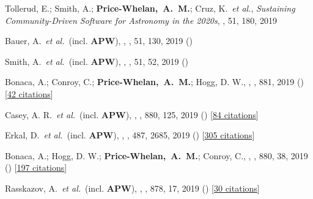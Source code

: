 {\item[{\color{deemph}\scriptsize61}]Tollerud, E.; Smith, A.; \textbf{Price-Whelan,~A.~M.}; Cruz, K.~\textit{et al.}, \textit{Sustaining Community-Driven Software for Astronomy in the 2020s}, \baas, 51, 180, 2019

\item[{\color{deemph}\scriptsize60}]Bauer, A.~\textit{et al.}~(incl. \textbf{APW}), , \baas, 51, 130, 2019 ()

\item[{\color{deemph}\scriptsize59}]Smith, A.~\textit{et al.}~(incl. \textbf{APW}), , \baas, 51, 52, 2019 ()

\item[{\color{deemph}\scriptsize58}]Bonaca, A.; Conroy, C.; \textbf{Price-Whelan,~A.~M.}; Hogg, D. W., , \apj, 881, 2019 () [\href{http://adsabs.harvard.edu/abs/2019ApJ...881L..37B}{42 citations}]

\item[{\color{deemph}\scriptsize57}]Casey, A. R.~\textit{et al.}~(incl. \textbf{APW}), , \apj, 880, 125, 2019 () [\href{http://adsabs.harvard.edu/abs/2019ApJ...880..125C}{84 citations}]

\item[{\color{deemph}\scriptsize56}]Erkal, D.~\textit{et al.}~(incl. \textbf{APW}), , \mnras, 487, 2685, 2019 () [\href{http://adsabs.harvard.edu/abs/2019MNRAS.487.2685E}{305 citations}]

\item[{\color{deemph}\scriptsize55}]Bonaca, A.; Hogg, D. W.; \textbf{Price-Whelan,~A.~M.}; Conroy, C., , \apj, 880, 38, 2019 () [\href{http://adsabs.harvard.edu/abs/2019ApJ...880...38B}{197 citations}]

\item[{\color{deemph}\scriptsize54}]Rasskazov, A.~\textit{et al.}~(incl. \textbf{APW}), , \apj, 878, 17, 2019 () [\href{http://adsabs.harvard.edu/abs/2019ApJ...878...17R}{30 citations}]

}
